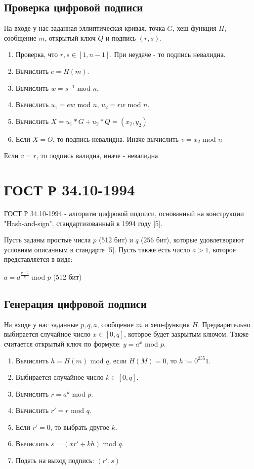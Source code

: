 \documentclass[colorthm]{./civarticle}
\begin{document}
\subsection{Проверка цифровой подписи}
На входе у нас заданная эллиптическая кривая, точка $G$, хеш-функция $H$, сообщение $m$, открытый ключ $Q$ и подпись $(r, s)$.

\begin{enumerate}
    \item Проверка, что $r, s \in [1, n-1]$. При неудаче - то подпись невалидна.
    \item Вычислить $e = H(m)$.
    \item Вычислить $w = s^{-1} $ mod $n$.
    \item Вычислить $u_1 = ew$ mod $n$, $u_2 = rw$ mod $n$.
    \item Вычислить $X = u_1*G + u_2*Q = (x_2, y_2)$
    \item Если $X = O$, то подпись невалидна. Иначе вычислить $v = x_2 $ mod $ n$
\end{enumerate}

Если $v = r$, то подпись валидна, иначе - невалидна.

\section{ГОСТ Р 34.10-1994}
ГОСТ Р 34.10-1994 - алгоритм цифровой подписи, основанный на конструкции "Hash-and-sign", стандартизованный в 1994 году [5].

Пусть заданы простые числа $p$ (512 бит) и $q$ (256 бит), которые удовлетворяют условиям описанным в стандарте [5]. Пусть также есть число $a > 1$, которое представляется в виде:

$a = d^{\frac{p-1}{q}}$ mod $p$ (512 бит)

\subsection{Генерация цифровой подписи}
На входе у нас заданные $p, q, a$, сообщение $m$ и хеш-функция $H$. Предварительно выбирается случайное число $x \in [0, q]$, которое будет закрытым ключом. Также считается открытый ключ по формуле: $y = a^x$ mod $p$.

\begin{enumerate}
    \item Вычислить $h=H(m)$ mod $q$, если $H(M)=0$, то $h:=0^{255}1$.
    \item Выбирается случайное число $k \in [0, q]$.
    \item Вычислить $r = a^k$ mod $p$.
    \item Вычислить $r' = r$ mod $q$.
    \item Если $r'=0$, то выбрать другое $k$.
    \item Вычислить $s = (xr'+kh)$ mod $q$.
    \item Подать на выход подпись: $(r', s)$
\end{enumerate}
\end{document}
